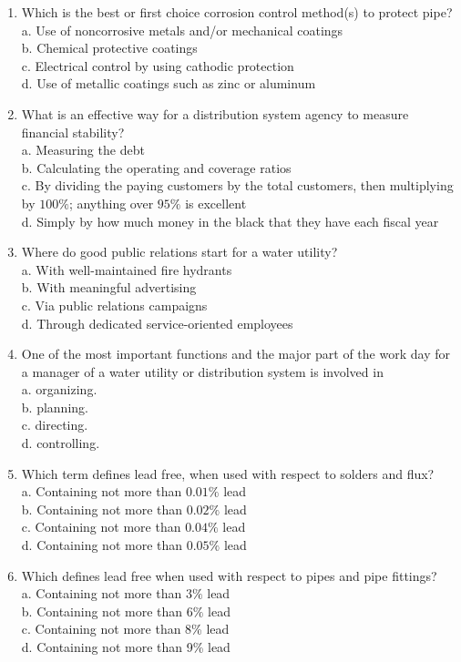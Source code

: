 \documentclass[10pt]{article}
\begin{document}
\begin{enumerate}
  \item Which is the best or first choice corrosion control method(s) to protect pipe?\\
a. Use of noncorrosive metals and/or mechanical coatings\\
b. Chemical protective coatings\\
c. Electrical control by using cathodic protection\\
d. Use of metallic coatings such as zinc or aluminum 

\item What is an effective way for a distribution system agency to measure financial stability?\\
a. Measuring the debt\\
b. Calculating the operating and coverage ratios\\
c. By dividing the paying customers by the total customers, then multiplying by $100 \%$; anything over $95 \%$ is excellent\\
d. Simply by how much money in the black that they have each fiscal year

  \item Where do good public relations start for a water utility?\\
a. With well-maintained fire hydrants\\
b. With meaningful advertising\\
c. Via public relations campaigns\\
d. Through dedicated service-oriented employees

  \item One of the most important functions and the major part of the work day for a manager of a water utility or distribution system is involved in\\
a. organizing.\\
b. planning.\\
c. directing.\\
d. controlling.

  \item Which term defines lead free, when used with respect to solders and flux?\\
a. Containing not more than $0.01 \%$ lead\\
b. Containing not more than $0.02 \%$ lead\\
c. Containing not more than $0.04 \%$ lead\\
d. Containing not more than $0.05 \%$ lead

  \item Which defines lead free when used with respect to pipes and pipe fittings?\\
a. Containing not more than $3 \%$ lead\\
b. Containing not more than $6 \%$ lead\\
c. Containing not more than 8\% lead\\
d. Containing not more than 9\% lead


\end{enumerate}
\end{document}
